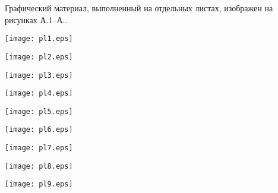 
Графический материал, выполненный на отдельных листах,
изображен на рисунках А.1--А..
\setcounter{числоПлакатов}{0}

\renewcommand{\thefigure}{А.\arabic{figure}} %

\begin{landscape}

\begin{плакат}
    \texttt{[image: pl1.eps]}
    \label{pl1:image}      
\end{плакат}

\begin{плакат}
    \texttt{[image: pl2.eps]}
    \label{pl2:image}      
\end{плакат}

\begin{плакат}
    \texttt{[image: pl3.eps]}
    \label{pl3:image}      
\end{плакат}

\begin{плакат}
    \texttt{[image: pl4.eps]}
    \label{pl4:image}      
\end{плакат}

\begin{плакат}
	\texttt{[image: pl5.eps]}
	\label{pl5:image}      
\end{плакат}

\begin{плакат}
	\texttt{[image: pl6.eps]}
	\label{pl6:image}      
\end{плакат}

\begin{плакат}
	\texttt{[image: pl7.eps]}
	\label{pl7:image}      
\end{плакат}

\begin{плакат}
	\texttt{[image: pl8.eps]}
	\label{pl8:image}      
\end{плакат}

\begin{плакат}
	\texttt{[image: pl9.eps]}
	\label{pl9:image}      
\end{плакат}

\end{landscape}
